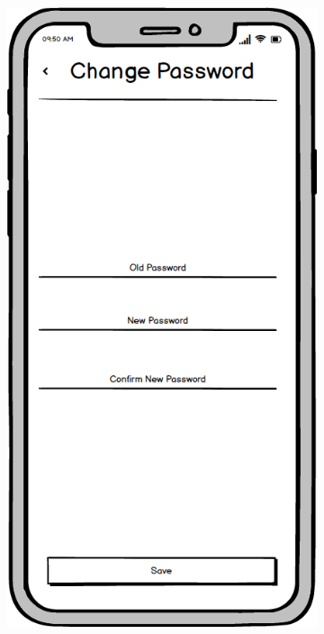 \begin{figure}
\begin{subfigure}[b]{0.3\textwidth}
        \label{fig:change_email}
    \end{subfigure}
    \hfill
    \begin{subfigure}[b]{0.3\textwidth}
        \centering
        \includegraphics[width=\textwidth]{./graphics/design/Change Password.png}

\end{subfigure}
\end{figure}
